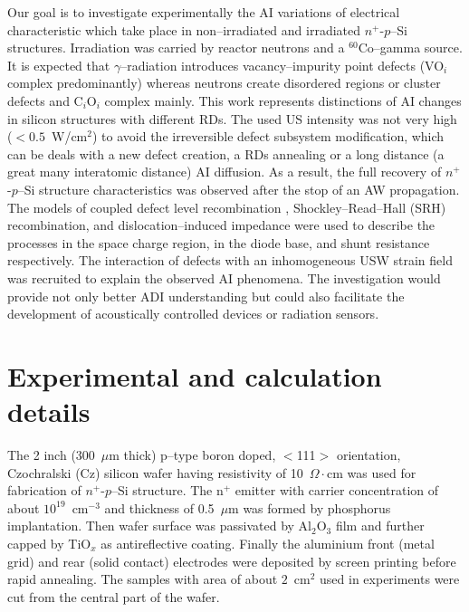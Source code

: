 \documentclass[aip,jap,reprint]{revtex4-1}
\begin{document}
Our goal is to investigate experimentally the AI variations of electrical characteristic which take place in non--irradiated and irradiated $n^+$-$p$--Si structures.
Irradiation was carried by reactor neutrons and a $^{60}$Co--gamma source.
It is expected that $\gamma$--radiation introduces vacancy--impurity point defects (VO$_i$ complex predominantly) \cite{NIEL:Jafari,Gamma:Prabhakara,NIEL:Moll}
whereas neutrons create disordered regions or cluster defects \cite{Neutron:Arutyunov,Rew:Srour,Pintilie} and C$_i$O$_i$ complex  \cite{NIEL:Moll,neutron:Londos} mainly.
This work represents distinctions of AI changes in silicon structures with different RDs.
The used US intensity was not very high ($<0.5$~W/cm$^2$) to avoid the irreversible defect subsystem modification, which can be deals with a new defect creation, a RDs annealing or a long distance (a great many interatomic distance) AI diffusion.
As a result, the full recovery of $n^+$-$p$--Si structure characteristics was observed after the stop of an AW propagation.
The models of coupled defect level recombination \cite{CDLR:JAP1995,CDLR:JAP}, Shockley--Read--Hall (SRH) recombination, and dislocation--induced impedance \cite{Rsh:Gopal2003,Rsh:Gopal2004} were used to describe the processes in the space charge region,  in the diode base, and shunt resistance respectively.
The interaction of defects with an inhomogeneous USW strain ﬁeld \cite{MirzadeJAP2011,PeleshchakUJF2016} was recruited to explain the observed AI phenomena.
The investigation would provide not only better ADI understanding but could also facilitate the development of acoustically controlled devices or radiation sensors.



\section{Experimental and calculation details}

The 2 inch (300~$\mu$m thick) p--type boron doped, $<$111$>$ orientation, Czochralski (Cz) silicon wafer having resistivity of 10~$\Omega\cdot$cm was used for fabrication of  $n^+$-$p$--Si structure.
The n$^+$ emitter with carrier concentration of about $10^{19}$~cm$^{-3}$ and thickness of 0.5~$\mu$m was formed by phosphorus implantation.
Then wafer surface was passivated by Al$_2$O$_3$ film and further capped by TiO$_x$ as antireflective coating.
Finally the aluminium front (metal grid) and rear (solid contact) electrodes were deposited by screen printing before rapid annealing.
The samples with area of about $2$~cm$^{2}$ used in experiments were cut from the central part of the wafer.
\end{document}
